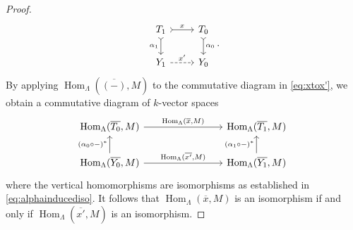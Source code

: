 \documentclass[10pt,twoside, a4paper,reqno]{amsart}
\DeclareMathOperator{\Hom}{Hom}
\theoremstyle{definition}
\begin{document}
\begin{proof}
	\begin{equation}\label{eq:xtox'}
	\begin{tikzcd} 
	T_1 \arrow[d,tail, "\alpha_1", swap] \arrow[r, tail, "x"]& T_0\arrow[d,tail, "\alpha_0"] \\
	Y_1 \arrow[r, "x'", dashed] & Y_0 
	\end{tikzcd} {.}
	\end{equation}
	By applying $\Hom_{\Lambda}({\overline{(-)}},M)$ to the commutative diagram in \eqref{eq:xtox'}, we obtain a commutative diagram of $k$-vector spaces
	\[
	\begin{tikzcd} [column sep=8em]
	\Hom_{\Lambda}(\overline{T_0},M) \arrow[r, "{\Hom_{\Lambda}(\overline{x},M)}"]& \Hom_{\Lambda}(\overline{T_1},M)  \\
	\Hom_{\Lambda}(\overline{Y_0},M) \arrow[r, "{\Hom_{\Lambda}(\overline{x'},M)}"] \arrow[u, "{(\alpha_0\circ -)^\ast}"] & \Hom_{\Lambda}(\overline{Y_1},M)  \arrow[u, "{(\alpha_1\circ -)^\ast}"]  	\end{tikzcd}
	\]
	where the vertical homomorphisms are isomorphisms {as established in \eqref{eq:alphainducediso}}. It follows that $\Hom_\Lambda(\overline{x}, M)$ is an isomorphism if and only if $\Hom_\Lambda(\overline{x'}, M)$ is an isomorphism.
	

\end{proof}
\end{document}

